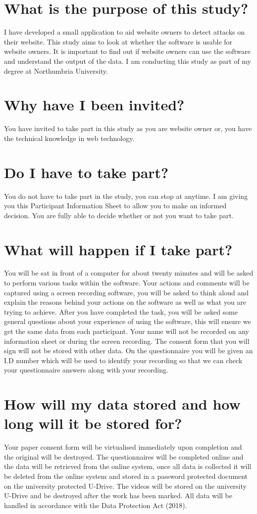 \section{What is the purpose of this study?}
I have developed a small application to aid website owners to detect attacks on their website. This study aims to look at whether the software is usable for website owners. It is important to find out if website owners can use the software and understand the output of the data. I am conducting this study as part of my degree at Northumbria University. 
\section{Why have I been invited?}
You have invited to take part in this study as you are website owner or, you have the technical knowledge in web technology. 
\section{Do I have to take part?}
You do not have to take part in the study, you can stop at anytime. I am giving you this Participant Information Sheet to allow you to make an informed decision. You are fully able to decide whether or not you want to take part. 

\section{What will happen if I take part?}
You will be sat in front of a computer for about twenty minutes and will be asked to perform various tasks within the software. Your actions and comments will be captured using a screen recording software, you will be asked to think aloud and explain the reasons behind your actions on the software as well as what you are trying to achieve. After you have completed the task, you will be asked some general questions about your experience of using the software, this will ensure we get the same data from each participant. Your name will not be recorded on any information sheet or during the screen recording. The consent form that you will sign will not be stored with other data. On the questionnaire you will be given an I.D number which will be used to identify your recording so that we can check your questionnaire answers along with your recording. 
\section{How will my data stored and how long will it be stored for?}
Your paper consent form will be virtualised immediately upon completion and the original will be destroyed. The questionnaires will be completed online and the data will be retrieved from the online system, once all data is collected it will be deleted from the online system and stored in a password protected document on the university protected U-Drive. The videos will be stored on the university U-Drive and be destroyed after the work has been marked.  All data will be handled in accordance with the Data Protection Act (2018).

